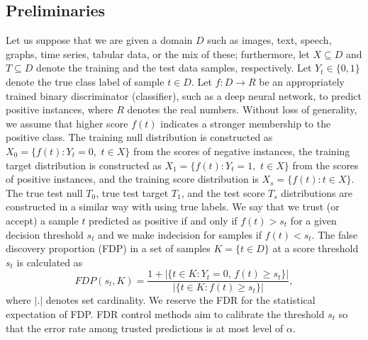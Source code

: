 \documentclass{article}
\begin{document}
\subsection{Preliminaries}

Let us suppose that we are given a domain $D$ such as images, text, speech, graphs, time series, tabular data, or the mix of these; furthermore, let $X\subseteq D$ and $T\subseteq D$ denote the training and  the test data samples, respectively. Let $Y_t\in\{0,1\}$ denote the true class label of sample $t\in D$. Let $f:D\rightarrow R$ be an appropriately trained binary discriminator (classifier), such as a deep neural network, to predict positive instances, where $R$ denotes the real numbers. Without loss of generality, we assume that higher score $f(t)$ indicates a stronger membership to the positive class. The training null distribution is constructed as $X_0=\{f(t):Y_t = 0,\,\,  t\in X\}$ from the scores of negative instances, the training target distribution is constructed as $X_1=\{f(t): Y_t = 1,\,\,  t\in X\}$ from the scores of positive instances, and the training score distribution is $X_s=\{f(t): t\in X\}$. The true test null $T_0$, true test target $T_1$, and the test score $T_s$ distributions are constructed in a similar way with using true labels. We say that we trust (or accept) a  sample $t$ predicted as positive if and only if $f(t)>s_t$ for a given decision threshold  $s_t$ and we make indecision for samples if $f(t) < s_t$. The false discovery proportion (FDP) in a set of samples $K=\{t\in D\}$ at a score threshold $s_t$ is calculated as 
\begin{equation*}
	FDP(s_t,K)=\frac{1+|\{t\in K: Y_t=0,\,f(t)\ge s_t\}|}{|\{t\in K:f(t)\ge s_t\}|},
\end{equation*}
\noindent where $|.|$ denotes set cardinality. We reserve the FDR for the statistical expectation of FDP. FDR control methods aim to calibrate the threshold  $s_t$ so that the error rate among trusted predictions is at most level of $\alpha$. %

\end{document}
